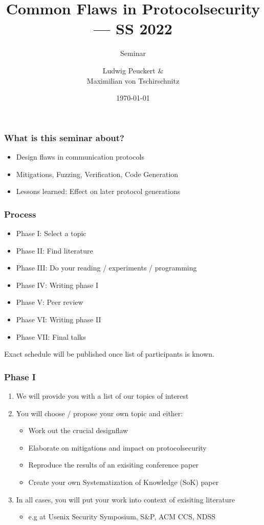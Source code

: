 \documentclass[xcolor={usenames,dvipsnames}]{beamer}
\title{Common Flaws in Protocolsecurity --- SS 2022}
\subtitle{Seminar}
\author[L. Peuckert]
{
	Ludwig Peuckert \& \\ Maximilian von Tschirschnitz
}
\institute[Chair I20, TUM]
{
	Lehrstuhl f\"ur Sicherheit in der Informatik / I20 \\
	Prof.\ Dr.\ Claudia Eckert\\
	Technische Universität München
}
\date{\today}
\begin{document}
\begin{frame}
	\titlepage
\end{frame}

\begin{frame}
	\frametitle{What is this seminar about?}

	\hfill
	\begin{itemize}
		\item \alert{Design flaws} in communication protocols
		\item \alert{Mitigations}, Fuzzing, Verification, Code Generation
		\item \alert{Lessons learned:} Effect on later protocol generations
	\end{itemize}
\end{frame}

%
\begin{frame}[label=process]
	\frametitle{Process}
	\begin{itemize}
		\item Phase \alert{I}: Select a \alert{topic}
		\item Phase \alert{II}: Find \alert{literature}
		\item Phase \alert{III}: Do your \alert{reading / experiments / programming}
		\item Phase \alert{IV}: \alert{Writing} phase I
		\item Phase \alert{V}: \alert{Peer review}
		\item Phase \alert{VI}: \alert{Writing} phase II
		\item Phase \alert{VII}: Final \alert{talks}
	\end{itemize}
	Exact schedule will be published once list of participants is known.
\end{frame}

\begin{frame}
	\frametitle{Phase \alert{I}}
	\begin{enumerate}
		\item We will provide you with a list of \alert{our topics of interest}
		\item You will \alert{choose / propose} your own topic and either:
			\begin{itemize}
				\item Work out the crucial designflaw
				\item Elaborate on mitigations and impact on protocolsecurity
				\item Reproduce the results of an exisiting conference paper
				\item Create your own Systematization of Knowledge (SoK) paper
			\end{itemize}
		\item In all cases, you will put your work into context of exisiting literature
			\begin{itemize}
				\item e.g at Usenix Security Symposium, S\&P, ACM CCS, NDSS
			\end{itemize}
	\end{enumerate}
\end{frame}
\end{document}
